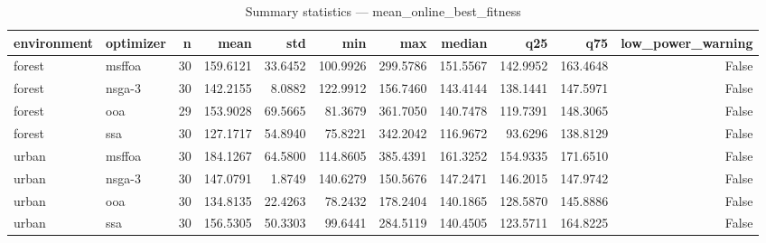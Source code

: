 \begin{table}
\caption{Summary statistics — mean_online_best_fitness}
\label{tab:online_summary-mean_online_best_fitness}
\begin{tabular}{llrrrrrrrrr}
\toprule
environment & optimizer & n & mean & std & min & max & median & q25 & q75 & low\_power\_warning \\
\midrule
forest & msffoa & 30 & 159.6121 & 33.6452 & 100.9926 & 299.5786 & 151.5567 & 142.9952 & 163.4648 & False \\
forest & nsga-3 & 30 & 142.2155 & 8.0882 & 122.9912 & 156.7460 & 143.4144 & 138.1441 & 147.5971 & False \\
forest & ooa & 29 & 153.9028 & 69.5665 & 81.3679 & 361.7050 & 140.7478 & 119.7391 & 148.3065 & False \\
forest & ssa & 30 & 127.1717 & 54.8940 & 75.8221 & 342.2042 & 116.9672 & 93.6296 & 138.8129 & False \\
urban & msffoa & 30 & 184.1267 & 64.5800 & 114.8605 & 385.4391 & 161.3252 & 154.9335 & 171.6510 & False \\
urban & nsga-3 & 30 & 147.0791 & 1.8749 & 140.6279 & 150.5676 & 147.2471 & 146.2015 & 147.9742 & False \\
urban & ooa & 30 & 134.8135 & 22.4263 & 78.2432 & 178.2404 & 140.1865 & 128.5870 & 145.8886 & False \\
urban & ssa & 30 & 156.5305 & 50.3303 & 99.6441 & 284.5119 & 140.4505 & 123.5711 & 164.8225 & False \\
\bottomrule
\end{tabular}
\end{table}
